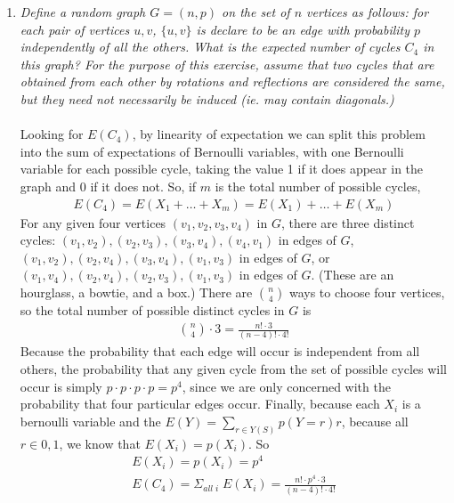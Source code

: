 \documentclass[a4paper]{article}
\begin{document}
\begin{enumerate}
\item \emph{Define a random graph $G = (n,p)$ on the set of $n$ vertices as follows: for each pair of vertices $u, v$, $\{u, v\}$ is declare to be an edge with probability $p$ independently of all the others. What is the expected number of cycles $C_4$ in this graph? For the purpose of this exercise, assume that two cycles that are obtained from each other by rotations and reflections are considered the same, but they need not necessarily be induced (ie. may contain diagonals.)} \\
\\
Looking for $E(C_4)$, by linearity of expectation we can split this problem into the sum of expectations of Bernoulli variables, with one Bernoulli variable for each possible cycle, taking the value 1 if it does appear in the graph and 0 if it does not. So, if $m$ is the total number of possible cycles,
\begin{align*}
E(C_4) = E(X_1 + \dots + X_m) = E(X_1) + \dots + E(X_m)
\end{align*}
For any given four vertices $(v_1,v_2,v_3,v_4)$ in $G$, there are three distinct cycles: $(v_1,v_2),(v_2,v_3),(v_3,v_4),(v_4,v_1)$ in edges of $G$, $(v_1,v_2),(v_2,v_4),(v_3,v_4),(v_1,v_3)$ in edges of $G$, or $(v_1,v_4),(v_2,v_4),(v_2,v_3),(v_1,v_3)$ in edges of $G$. (These are an hourglass, a bowtie, and a box.) There are $\binom{n}{4}$ ways to choose four vertices, so the total number of possible distinct cycles in $G$ is
\begin{align*}
\binom{n}{4} \cdot 3 = \frac{n! \cdot 3}{(n-4)! \cdot 4!}
\end{align*}
Because the probability that each edge will occur is independent from all others, the probability that any given cycle from the set of possible cycles will occur is simply $p \cdot p \cdot p \cdot p = p^4$, since we are only concerned with the probability that four particular edges occur. Finally, because each $X_i$ is a bernoulli variable and the $E(Y) = \sum_{r \in Y(S)} p(Y = r)r$, because all $r \in {0,1}$, we know that $E(X_i) = p(X_i)$. So
\begin{align*}
E(X_i) = p(X_i) = p^4 \\
E(C_4) = \Sigma_{all\;i}\; E(X_i) = \frac{n! \cdot p^4 \cdot 3}{(n-4)! \cdot 4!} \\
\end{align*}




\end{enumerate}
\end{document}
